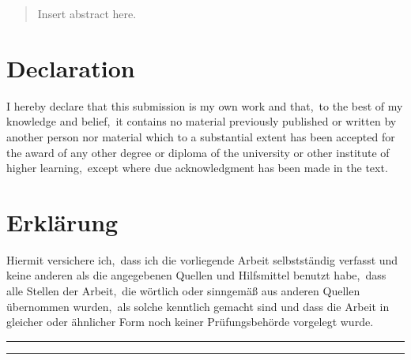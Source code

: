 \begin{abstract}
Insert abstract here.
\end{abstract}

\pagestyle{scrplain} %
\section*{Declaration}
{
I hereby declare that this submission is my own work and that,\ to the best of my
knowledge and belief,\ it contains no material previously published or written by another
person nor material which to a substantial extent has been accepted for the award of any
other degree or diploma of the university or other institute of higher learning,\ except
where due acknowledgment has been made in the text\@.}

\section*{Erkl\"{a}rung}
{
Hiermit versichere ich,\ dass ich die vorliegende Arbeit selbstst\"{a}ndig verfasst und keine
anderen als die angegebenen Quellen und Hilfsmittel benutzt habe,\ dass alle Stellen
der Arbeit,\ die w\"{o}rtlich oder sinngem\"{a}\ss{} aus anderen Quellen \"{u}bernommen wurden,\ als
solche kenntlich gemacht sind und dass die Arbeit in gleicher oder \"{a}hnlicher Form noch
keiner Pr\"{u}fungsbeh\"{o}rde vorgelegt wurde\@.}

\vspace{2cm}
\rule{4cm}{0.1pt} \hfill \rule{7cm}{0.1pt} \\
\hspace*{1.75cm} \textsc{\thedate} \hspace*{6.8cm} \textsc{\theauthor}

\cleardoublepage{}
\pagestyle{scrheadings} %

\tableofcontents

\cleardoublepage{}
